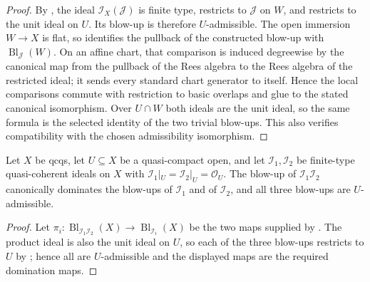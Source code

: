 \begin{proof}
  By , the ideal
  $\mathcal I_X(\mathcal J)$ is finite type, restricts to $\mathcal J$ on
  $W$, and restricts to the unit ideal on $U$.  Its blow-up is therefore
  $U$-admissible.  The open immersion $W\to X$ is flat, so
   identifies the pullback of the
  constructed blow-up with $\operatorname{Bl}_{\mathcal J}(W)$.  On an
  affine chart, that comparison is induced degreewise by the canonical map
  from the pullback of the Rees algebra to the Rees algebra of the restricted
  ideal; it sends every standard chart generator to itself.  Hence the local
  comparisons commute with restriction to basic overlaps and glue to the
  stated canonical isomorphism.  Over $U\cap W$ both ideals are the unit
  ideal, so the same formula is the selected identity of the two trivial
  blow-ups.  This also verifies compatibility with the chosen admissibility
  isomorphism.
\end{proof}

\begin{lemma}
  \label{lemma:nagata-product-ideal-common-blowup}

  Let $X$ be qcqs, let $U\subseteq X$ be a quasi-compact open, and let
  $\mathcal I_1,\mathcal I_2$ be finite-type quasi-coherent ideals on $X$ with
  $\mathcal I_1|_U=\mathcal I_2|_U=\mathcal O_U$.  The blow-up of
  $\mathcal I_1\mathcal I_2$ canonically dominates the blow-ups of
  $\mathcal I_1$ and of $\mathcal I_2$, and all three blow-ups are
  $U$-admissible.
\end{lemma}

\begin{proof}
  Let $\pi_i\colon\operatorname{Bl}_{\mathcal I_1\mathcal I_2}(X)
  \to\operatorname{Bl}_{\mathcal I_i}(X)$ be the two maps supplied by
  .  The product ideal is
  also the unit ideal on $U$, so each of the three blow-ups restricts to $U$
  by ; hence all are
  $U$-admissible and the displayed maps are the required domination maps.
\end{proof}

